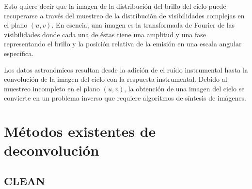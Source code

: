 Esto quiere decir que la imagen de la distribución del brillo del cielo puede recuperarse a través del muestreo de la distribución de visibilidades complejas en el plano $(u,v)$. En esencia, una imagen es la transformada de Fourier de las visibilidades donde cada una de éstas tiene una amplitud y una fase representando el brillo y la posición relativa de la emisión en una escala angular específica.






Los datos astronómicos resultan desde la adición de el ruido instrumental hasta la convolución de la imagen del cielo con la respuesta instrumental. Debido al muestreo incompleto en el plano $(u,v)$, la obtención de una imagen del cielo se convierte en un problema inverso que requiere algoritmos de síntesis de imágenes.


\section{Métodos existentes de deconvolución}

\subsection{CLEAN}

